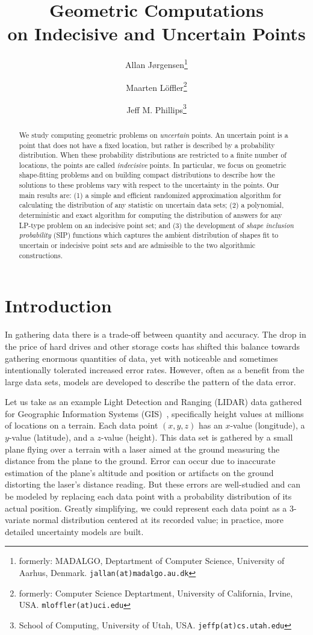 \documentclass{journal}
\title{Geometric Computations\\ on Indecisive and Uncertain Points 
}
\author{
  Allan J{\o}rgensen\thanks
  { formerly: MADALGO, Deptartment of Computer Science, University of Aarhus, Denmark.
    \texttt{jallan(at)madalgo.au.dk}
  }
  \and
  Maarten L\"offler\thanks
  {
    formerly: Computer Science Deptartment, University of California, Irvine, USA.
    \texttt{mloffler(at)uci.edu}
  }
  \and
  Jeff M. Phillips\thanks
  {
    School of Computing, University of Utah, USA.
    \texttt{jeffp(at)cs.utah.edu}
  }
}
\date{ }
\begin{document}
\maketitle

\begin{abstract}
We study computing geometric problems on \emph {uncertain} points. An uncertain point is a point that does not have a fixed location, but rather is described by a probability distribution.  When these probability distributions are restricted to a finite number of locations, the points are called \emph{indecisive} points.  In particular, we focus on geometric shape-fitting problems and on building compact distributions to describe how the solutions to these problems vary with respect to the uncertainty in the points.  Our main results are:
(1) a simple and efficient randomized approximation algorithm for calculating the distribution of any statistic on uncertain data sets;
(2) a polynomial, deterministic and exact algorithm for computing the distribution of answers for any LP-type problem on an indecisive point set; and
(3) the development of \emph{shape inclusion probability} (SIP) functions which captures the ambient distribution of shapes fit to uncertain or indecisive point sets and are admissible to the two algorithmic constructions.  
\end{abstract}








\section {Introduction}

In gathering data there is a trade-off between quantity and accuracy.  The drop in the price of hard drives and other storage costs has shifted this balance towards gathering enormous quantities of data, yet with noticeable and sometimes intentionally tolerated increased error rates.  However, often as a benefit from the large data sets, models are developed to describe the pattern of the data error.



Let us take as an example Light Detection and Ranging (LIDAR) data gathered for Geographic Information Systems (GIS)~\cite{LKC04}, specifically height values at millions of locations on a terrain.
Each data point $(x,y,z)$ has an $x$-value (longitude), a $y$-value (latitude), and a $z$-value (height).
This data set is gathered by a small plane flying over a terrain with a laser aimed at the ground measuring the distance from the plane to the ground.  Error can occur due to inaccurate estimation of the plane's altitude and position or artifacts on the ground distorting the laser's distance reading.
But these errors are well-studied and can be modeled by replacing each data point with a probability distribution of its actual position.  Greatly simplifying, we could represent each data point as a $3$-variate normal distribution centered at its recorded value; in practice, more detailed uncertainty models are built.
\end{document}
